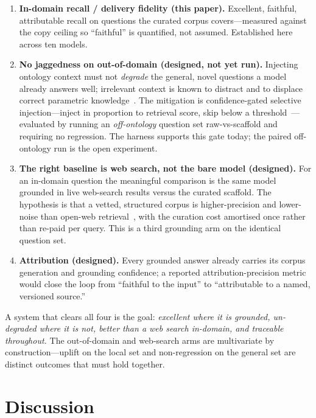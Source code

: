 \documentclass[11pt]{article}
\begin{document}
\begin{enumerate}[topsep=2pt,itemsep=2pt,leftmargin=1.4em]
\item \textbf{In-domain recall / delivery fidelity (this paper).} Excellent, faithful,
attributable recall on questions the curated corpus covers---measured against the copy ceiling so
``faithful'' is quantified, not assumed. Established here across ten models.
\item \textbf{No jaggedness on out-of-domain (designed, not yet run).} Injecting ontology context
must not \emph{degrade} the general, novel questions a model already answers well; irrelevant
context is known to distract and to displace correct parametric
knowledge~\cite{shi2023distracted,yoran2024robust,longpre2021entity}. The mitigation is
confidence-gated selective injection---inject in proportion to retrieval score, skip below a
threshold~\cite{mallen2023trust}---evaluated by running an \emph{off-ontology} question set
raw-vs-scaffold and requiring no regression. The harness supports this gate today; the paired
off-ontology run is the open experiment.
\item \textbf{The right baseline is web search, not the bare model (designed).} For an in-domain
question the meaningful comparison is the same model grounded in live web-search results versus
the curated scaffold. The hypothesis is that a vetted, structured corpus is higher-precision and
lower-noise than open-web retrieval~\cite{shi2023distracted}, with the curation cost amortised
once rather than re-paid per query. This is a third grounding arm on the identical question set.
\item \textbf{Attribution (designed).} Every grounded answer already carries its corpus
generation and grounding confidence; a reported attribution-precision metric would close the
loop from ``faithful to the input'' to ``attributable to a named, versioned source.''
\end{enumerate}

\noindent A system that clears all four is the goal: \emph{excellent where it is grounded,
un-degraded where it is not, better than a web search in-domain, and traceable throughout.} The
out-of-domain and web-search arms are multivariate by construction---uplift on the local set and
non-regression on the general set are distinct outcomes that must hold together.

\section{Discussion}
\end{document}
